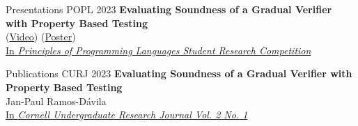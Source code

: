
\begin{rSection}{Presentations}
	\large{POPL 2023} \phantom{} \hspace{3.5mm} \textbf{Evaluating Soundness of a Gradual Verifier with Property Based Testing}
	\\ 
	\phantom{} \hspace{2.6cm} \small{(\href{https://www.youtube.com/watch?v=sIIwmw0z2Yg}{Video\ExternalLink}) (\href{https://jpramos.me/data/pdf/POPL%2023%20SRC%20POSTER.pdf}{Poster\ExternalLink})}\normalsize{} 
	\\
	\phantom{} \hspace{2.6cm} \color{darkgray}\small{\href{https://popl23.sigplan.org/details/POPL-2023-student-research-competition/13/Evaluating-Soundness-of-a-Gradual-Verifier-with-Property-Based-Testing}{In \textit{Principles of Programming Languages Student Research Competition} \ExternalLink}}
\end{rSection}

\begin{rSection}{Publications}
	\large{CURJ 2023} \phantom{} \hspace{3.5mm} \textbf{Evaluating Soundness of a Gradual Verifier with Property Based Testing}
	\\ 
	\phantom{} \hspace{2.6cm} \small{Jan-Paul Ramos-D{\'a}vila}\normalsize{}
	\\
	\phantom{} \hspace{2.6cm} \color{darkgray}\small{\href{https://journals.library.cornell.edu/index.php/CURJ/}{In \textit{Cornell Undergraduate Research Journal Vol. 2 No. 1} \ExternalLink}}
\end{rSection}
